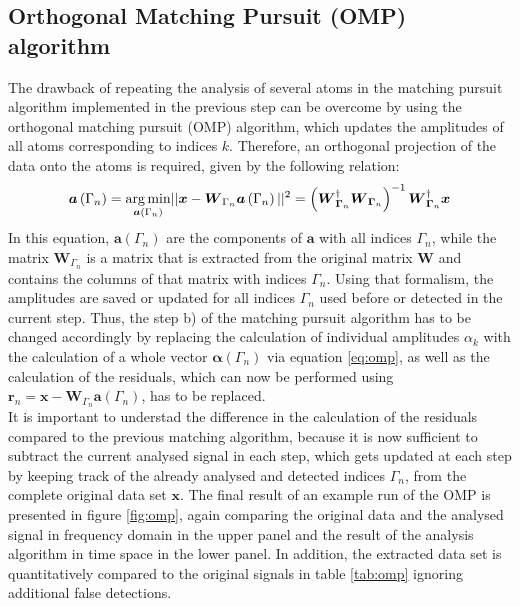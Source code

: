 \subsection{Orthogonal Matching Pursuit (OMP) algorithm}
The drawback of repeating the analysis of several atoms in the matching pursuit algorithm implemented in the previous step can be overcome by using the orthogonal matching pursuit (OMP) algorithm, which updates the amplitudes of all atoms corresponding to indices $k$. Therefore, an orthogonal projection of the data onto the atoms is required, given by the following relation: 
\begin{equation}
\boldsymbol{a}\left(\Gamma_{n}\right)= \underset{\boldsymbol{a}\left(\Gamma_{n}\right)}{\operatorname*{arg\,min}} || \boldsymbol{x}- \boldsymbol{W}_{\Gamma_{n}}\boldsymbol{a}\left(\Gamma_{n}\right) ||^{2}=\left(\boldsymbol{W}_{\boldsymbol{\Gamma}_{n}}^{\dag}\boldsymbol{W}_{\boldsymbol{\Gamma}_{n}}\right)^{-1}\boldsymbol{W}_{\boldsymbol{\Gamma}_{n}}^{\dag}\boldsymbol{x}
\label{eq:omp}
\end{equation}
In this equation, $\boldsymbol{a}\left(\Gamma_{n} \right)$ are the components of $\boldsymbol{a}$  with all indices $\Gamma_{n}$, while the matrix $\boldsymbol{W}_{\Gamma_{n}}$ is a matrix that is extracted from the original matrix $\boldsymbol{W}$ and contains the columns of that matrix with indices $\Gamma_{n}$.  Using that formalism, the amplitudes are saved or updated for all indices $\Gamma_{n}$ used before or detected in the current step. Thus, the step b) of the matching pursuit algorithm has to be changed accordingly by replacing the calculation of individual amplitudes $\alpha_{k}$ with the calculation of a whole vector $\boldsymbol{\alpha}\left(\Gamma_{n}\right)$ via equation \ref{eq:omp}, as well as the calculation of the residuals, which can now be performed using $\boldsymbol{r}_{n}=\boldsymbol{x}-\boldsymbol{W}_{\Gamma_{n}}\boldsymbol{a}\left(\Gamma_{n}\right)$, has to be replaced. \\
It is important to understad the difference in the calculation of the residuals compared to the previous matching algorithm, because it is now sufficient to subtract the current analysed signal in each step, which gets updated at each step by keeping track of the already analysed and detected indices $\Gamma_{n}$,  from the complete original data set $\boldsymbol{x}$. The final result of an example run of the OMP is presented in figure \ref{fig:omp}, again comparing the original data and the analysed signal in frequency domain in the upper panel and the result of the analysis algorithm in time space in the lower panel. In addition, the extracted data set is quantitatively compared to the original signals in table \ref{tab:omp} ignoring additional false detections.


